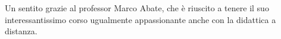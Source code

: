 Un sentito grazie al professor Marco Abate, che è riuscito a tenere il suo interessantissimo corso ugualmente appassionante anche con la didattica a distanza.
